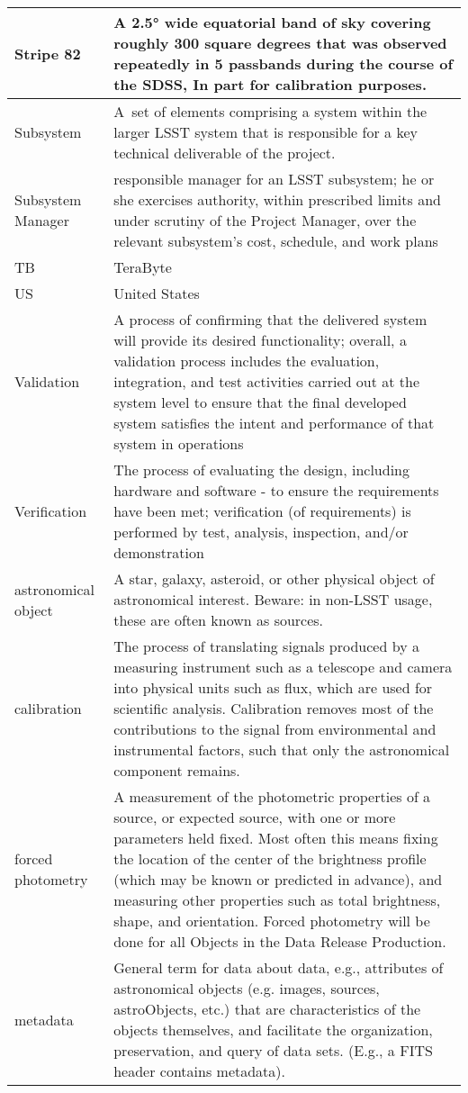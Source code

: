 \begin{longtable}{|p{}|p{}|}
Stripe 82 & A 2.5° wide equatorial band of sky covering roughly 300 square degrees that was observed repeatedly in 5 passbands during the course of the SDSS, In part for calibration purposes. \\\hline
Subsystem & A set of elements comprising a system within the larger LSST system that is responsible for a key technical deliverable of the project. \\\hline
Subsystem Manager & responsible manager for an LSST subsystem; he or she exercises authority, within prescribed limits and under scrutiny of the Project Manager, over the relevant subsystem's cost, schedule, and work plans \\\hline
TB & TeraByte \\\hline
US & United States \\\hline
Validation & A process of confirming that the delivered system will provide its desired functionality; overall, a validation process includes the evaluation, integration, and test activities carried out at the system level to ensure that the final developed system satisfies the intent and performance of that system in operations \\\hline
Verification & The process of evaluating the design, including hardware and software - to ensure the requirements have been met;  verification (of requirements) is performed by test, analysis, inspection, and/or demonstration \\\hline
astronomical object & A star, galaxy, asteroid, or other physical object of astronomical interest. Beware: in non-LSST usage, these are often known as sources. \\\hline
calibration & The process of translating signals produced by a measuring instrument such as a telescope and camera into physical units such as flux, which are used for scientific analysis. Calibration removes most of the contributions to the signal from environmental and instrumental factors, such that only the astronomical component remains. \\\hline
forced photometry & A measurement of the photometric properties of a source, or expected source, with one or more parameters held fixed. Most often this means fixing the location of the center of the brightness profile (which may be known or predicted in advance), and measuring other properties such as total brightness, shape, and orientation. Forced photometry will be done for all Objects in the Data Release Production. \\\hline
metadata & General term for data about data, e.g., attributes of astronomical objects (e.g. images, sources, astroObjects, etc.) that are characteristics of the objects themselves, and facilitate the organization, preservation, and query of data sets. (E.g., a FITS header contains metadata). \\\hline

\end{longtable}

